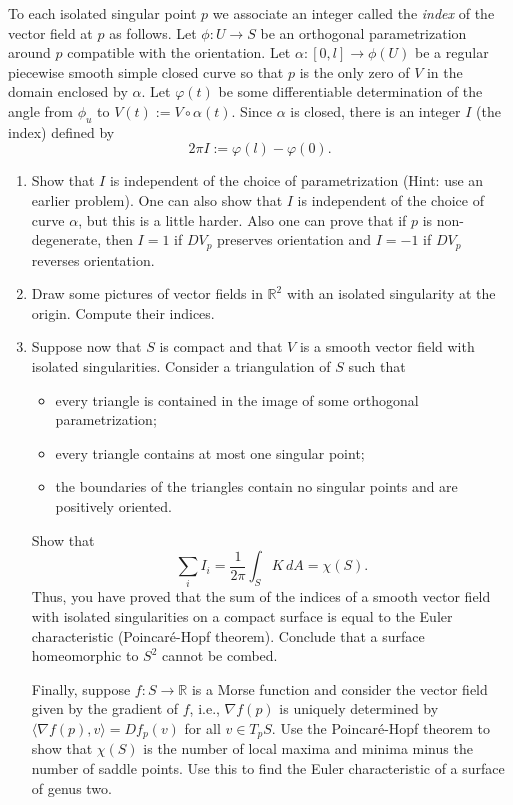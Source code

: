 \documentclass[12pt,a4paper]{article}
\theoremstyle{plain}
\theoremstyle{definition}      %
\begin{document}
	\medskip
	
	To each isolated singular point $p$ we associate an integer called the \emph{index} of the
	vector field at $p$ as follows. Let $\phi : U \to S$ be an orthogonal parametrization around
	$p$ compatible with the orientation. Let $\alpha : [0,l] \to \phi(U)$ be a regular
	piecewise smooth simple closed curve so that $p$ is the only zero of $V$ in the
	domain enclosed by $\alpha$. Let $\varphi(t)$ be some differentiable determination
	of the angle from $\phi_u$ to $V(t) := V\circ \alpha(t)$. Since $\alpha$ is closed,
	there is an integer $I$ (the index) defined by
	\[
	2\pi I := \varphi(l)-\varphi(0).
	\]
	
	\begin{enumerate}
		\item Show that $I$ is independent of the choice of parametrization
		(Hint: use an earlier problem). One can also show that $I$ is independent of the
		choice of curve $\alpha$, but this is a little harder. Also one can prove that if
		$p$ is non-degenerate, then $I=1$ if $DV_p$ preserves orientation and $I=-1$ if
		$DV_p$ reverses orientation.
		
		\item Draw some pictures of vector fields in $\mathbb{R}^2$ with an isolated
		singularity at the origin. Compute their indices.
		
		\item Suppose now that $S$ is compact and that $V$ is a smooth vector field with
		isolated singularities. Consider a triangulation of $S$ such that
		\begin{itemize}
			\item every triangle is contained in the image of some orthogonal parametrization;
			\item every triangle contains at most one singular point;
			\item the boundaries of the triangles contain no singular points and are positively oriented.
		\end{itemize}
		Show that
		\[
		\sum_i I_i=\frac{1}{2\pi}\int_S K\,dA=\chi(S).
		\]
		Thus, you have proved that the sum of the indices of a smooth vector field with isolated
		singularities on a compact surface is equal to the Euler characteristic (Poincar\'e-Hopf
		theorem). Conclude that a surface homeomorphic to $S^2$ cannot be combed.
		
		Finally, suppose $f : S \to \mathbb{R}$ is a Morse function and consider the vector field
		given by the gradient of $f$, i.e., $\nabla f(p)$ is uniquely determined by
		$\langle \nabla f(p),v\rangle = Df_p(v)$ for all $v \in T_pS$. Use the Poincar\'e-Hopf
		theorem to show that $\chi(S)$ is the number of local maxima and minima minus the number
		of saddle points. Use this to find the Euler characteristic of a surface of genus two.
	\end{enumerate}
	
\end{document}
